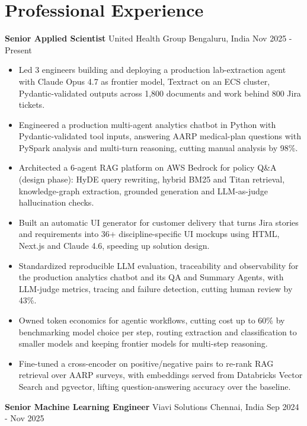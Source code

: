 \documentclass[10pt,a4paper]{article}
\newcommand{\role}[4]{\textbf{#1} \textbar{} #2 \hfill #3 \textbar{} #4\par}
\begin{document}
\section{Professional Experience}
\role{Senior Applied Scientist}{United Health Group}{Bengaluru, India}{Nov 2025 - Present}
\begin{itemize}
  \item Led 3 engineers building and deploying a production lab-extraction agent with Claude Opus 4.7 as frontier model, Textract on an ECS cluster, Pydantic-validated outputs across 1,800 documents and work behind 800 Jira tickets.
  \item Engineered a production multi-agent analytics chatbot in Python with Pydantic-validated tool inputs, answering AARP medical-plan questions with PySpark analysis and multi-turn reasoning, cutting manual analysis by 98\%.
  \item Architected a 6-agent RAG platform on AWS Bedrock for policy Q\&A (design phase): HyDE query rewriting, hybrid BM25 and Titan retrieval, knowledge-graph extraction, grounded generation and LLM-as-judge hallucination checks.
  \item Built an automatic UI generator for customer delivery that turns Jira stories and requirements into 36+ discipline-specific UI mockups using HTML, Next.js and Claude 4.6, speeding up solution design.
  \item Standardized reproducible LLM evaluation, traceability and observability for the production analytics chatbot and its QA and Summary Agents, with LLM-judge metrics, tracing and failure detection, cutting human review by 43\%.
  \item Owned token economics for agentic workflows, cutting cost up to 60\% by benchmarking model choice per step, routing extraction and classification to smaller models and keeping frontier models for multi-step reasoning.
  \item Fine-tuned a cross-encoder on positive/negative pairs to re-rank RAG retrieval over AARP surveys, with embeddings served from Databricks Vector Search and pgvector, lifting question-answering accuracy over the baseline.
\end{itemize}
\vspace{3pt}
\role{Senior Machine Learning Engineer}{Viavi Solutions}{Chennai, India}{Sep 2024 - Nov 2025}
\end{document}
